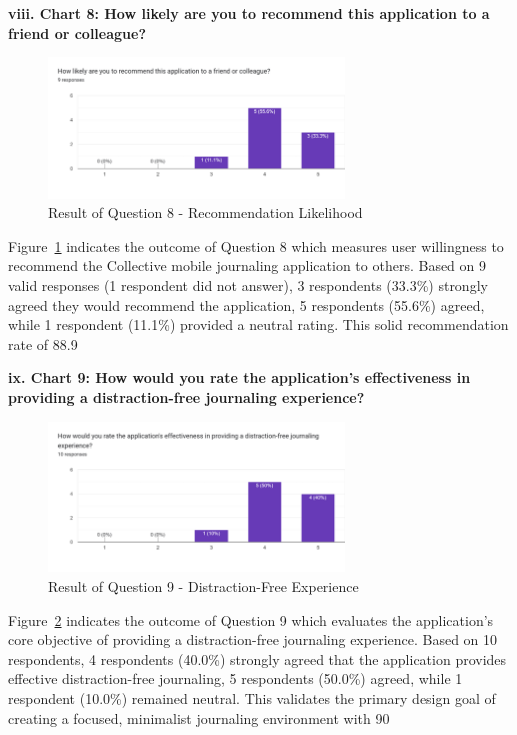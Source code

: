 \textbf{viii. Chart 8: How likely are you to recommend this application to a friend or colleague?}

\begin{figure}[H]
\centering
\includegraphics[width=0.7\textwidth]{files/imgs/survey/chart8_recommendation.png}
\caption{Result of Question 8 - Recommendation Likelihood}
\label{fig:chart8-recommend}
\end{figure}

Figure~\ref{fig:chart8-recommend} indicates the outcome of Question 8 which measures user willingness to recommend the Collective mobile journaling application to others. Based on 9 valid responses (1 respondent did not answer), 3 respondents (33.3\%) strongly agreed they would recommend the application, 5 respondents (55.6\%) agreed, while 1 respondent (11.1\%) provided a neutral rating. This solid recommendation rate of 88.9%

\textbf{ix. Chart 9: How would you rate the application's effectiveness in providing a distraction-free journaling experience?}

\begin{figure}[H]
\centering
\includegraphics[width=0.7\textwidth]{files/imgs/survey/chart9_distraction_free.png}
\caption{Result of Question 9 - Distraction-Free Experience}
\label{fig:chart9-distraction}
\end{figure}

Figure~\ref{fig:chart9-distraction} indicates the outcome of Question 9 which evaluates the application's core objective of providing a distraction-free journaling experience. Based on 10 respondents, 4 respondents (40.0\%) strongly agreed that the application provides effective distraction-free journaling, 5 respondents (50.0\%) agreed, while 1 respondent (10.0\%) remained neutral. This validates the primary design goal of creating a focused, minimalist journaling environment with 90%

